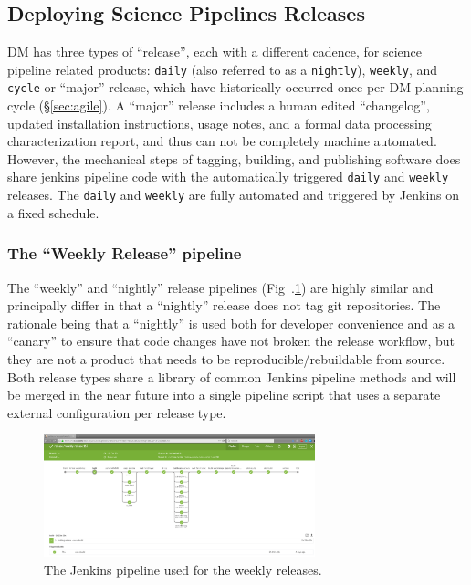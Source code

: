 \subsection{Deploying Science Pipelines Releases}
\label{sec:scipipe-deploy}

DM has three types of ``release'', each with a different cadence, for
science pipeline related products: \texttt{daily} (also referred to as a \texttt{nightly}), \texttt{weekly}, and \texttt{cycle} or ``major'' release, which have historically occurred once per DM planning cycle (\S\ref{sec:agile}).
A ``major'' release includes a human edited ``changelog'', updated installation
instructions, usage notes, and a formal data processing characterization report,
and thus can not be completely machine automated.  However, the
mechanical steps of tagging, building, and publishing software does share
jenkins pipeline code with the automatically triggered \texttt{daily} and
\texttt{weekly} releases.
The \texttt{daily} and \texttt{weekly} are fully automated and triggered by Jenkins on a fixed
schedule.

\subsubsection{The ``Weekly Release'' pipeline}
\label{sec:releases_weekly}
\label{sec:releases_daily}

The ``weekly'' and ``nightly'' release pipelines (Fig~.\ref{fig:weekly-pipeline}) are highly similar and
principally differ in that a ``nightly'' release does not tag git
repositories.  The rationale being that a ``nightly'' is used both for
developer convenience and as a ``canary'' to ensure that code changes have not
broken the release workflow, but they are not a product that needs to be
reproducible/rebuildable from source.
Both release types share a library of common Jenkins pipeline methods and
will be merged in the near future into a single pipeline script that uses
a separate external configuration per release type.

\begin{figure}[t]
\begin{center}
\includegraphics[width=0.7\textwidth]{pipelinedeploy-weekly-release}
\caption{The Jenkins pipeline used for the weekly releases.
\label{fig:weekly-pipeline}}
\end{center}
\end{figure}

